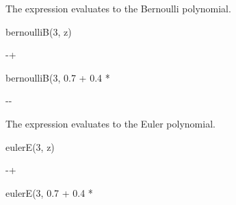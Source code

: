 {{{{{{{{{{{\begin{xtc}
\begin{xtccomment}
The expression  evaluates to the  Bernoulli
polynomial.
\end{xtccomment}
\begin{spadsrc}
bernoulliB(3, z)
\end{spadsrc}
\begin{TeXOutput}
\begin{fricasmath}{20}
-{\TIMES {}}+%
\TIMES {}%
\end{fricasmath}
\end{TeXOutput}
\end{xtc}
\begin{xtc}
\begin{xtccomment}
\end{xtccomment}
\begin{spadsrc}
bernoulliB(3, 0.7 + 0.4 * %
\end{spadsrc}
\begin{TeXOutput}
\begin{fricasmath}{21}
-{}-{\TIMES \ImaginaryI }%
\end{fricasmath}
\end{TeXOutput}
\end{xtc}
\begin{xtc}
\begin{xtccomment}
The expression
 evaluates to the  Euler polynomial.
\end{xtccomment}
\begin{spadsrc}
eulerE(3, z)
\end{spadsrc}
\begin{TeXOutput}
\begin{fricasmath}{22}
-{\TIMES {}}+%
\end{fricasmath}
\end{TeXOutput}
\end{xtc}
\begin{xtc}
\begin{xtccomment}
\end{xtccomment}
\begin{spadsrc}
eulerE(3, 0.7 + 0.4 * %
\end{spadsrc}

\end{xtc}}}}}}}}}}}}
